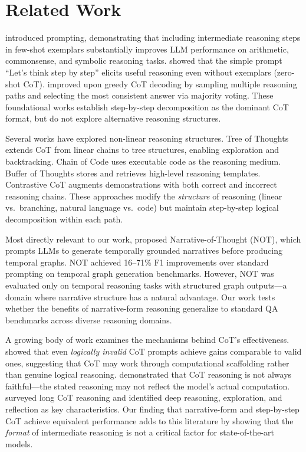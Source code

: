 \section{Related Work}
\label{sec:related}

 \citet{wei2022chain} introduced \chainofthought prompting, demonstrating that including intermediate reasoning steps in few-shot exemplars substantially improves LLM performance on arithmetic, commonsense, and symbolic reasoning tasks. \citet{kojima2022large} showed that the simple prompt ``Let's think step by step'' elicits useful reasoning even without exemplars (zero-shot CoT). \citet{wang2023selfconsistency} improved upon greedy CoT decoding by sampling multiple reasoning paths and selecting the most consistent answer via majority voting. These foundational works establish step-by-step decomposition as the dominant CoT format, but do not explore alternative reasoning structures.

 Several works have explored non-linear reasoning structures. Tree of Thoughts \citep{yao2023tree} extends CoT from linear chains to tree structures, enabling exploration and backtracking. Chain of Code \citep{li2023chain} uses executable code as the reasoning medium. Buffer of Thoughts \citep{yang2024buffer} stores and retrieves high-level reasoning templates. Contrastive CoT \citep{chia2023contrastive} augments demonstrations with both correct and incorrect reasoning chains. These approaches modify the \emph{structure} of reasoning (linear vs.\ branching, natural language vs.\ code) but maintain step-by-step logical decomposition within each path.

 Most directly relevant to our work, \citet{zhang2024narrative} proposed Narrative-of-Thought (NOT), which prompts LLMs to generate temporally grounded narratives before producing temporal graphs. NOT achieved 16--71\% F1 improvements over standard prompting on temporal graph generation benchmarks. However, NOT was evaluated only on temporal reasoning tasks with structured graph outputs---a domain where narrative structure has a natural advantage. Our work tests whether the benefits of narrative-form reasoning generalize to standard QA benchmarks across diverse reasoning domains.

 A growing body of work examines the mechanisms behind CoT's effectiveness. \citet{schaeffer2023invalid} showed that even \emph{logically invalid} CoT prompts achieve gains comparable to valid ones, suggesting that CoT may work through computational scaffolding rather than genuine logical reasoning. \citet{arcuschin2025chain} demonstrated that CoT reasoning is not always faithful---the stated reasoning may not reflect the model's actual computation. \citet{chen2025towards} surveyed long CoT reasoning and identified deep reasoning, exploration, and reflection as key characteristics. Our finding that narrative-form and step-by-step CoT achieve equivalent performance adds to this literature by showing that the \emph{format} of intermediate reasoning is not a critical factor for state-of-the-art models.


